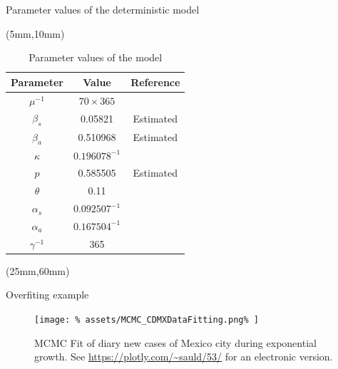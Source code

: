 \begin{bibunit}[plain]
	\begin{frame}{Parameter values of the deterministic model} %
	   \begin{textblock*}{120mm}(5mm,10mm)
		   \begin{table}
			\centering
			\begin{tabular}{ccc}
				\hline
				Parameter & Value & Reference\\ 
					\hline
				$\mu^{-1}$ & $70 \times 365$ & \cite{Acunya2021} 
				\\
				$\beta_s$ & 0.05821 & Estimated
				\\
				$\beta_a$ & 0.510968 & Estimated\\
				$\kappa$ & $0.196078^{-1}$ &  \cite{Tian2020}
				\\
				$p$ & 0.585505& Estimated\\          
				$\theta$ & 0.11 & \cite{Acunya2021}
				\\
				$\alpha_{s}$& $0.092507^{-1}$& \cite{Acunya2021}
				\\
				$\alpha_{a}$ & $0.167504^{-1}$& \cite{Acunya2021}
				\\ 
				$\gamma^{-1}$ & 365 & \cite{Acunya2021}
				\\
				\hline
			\end{tabular}
			\caption{Parameter values of the model}
			\label{table:parametermodel}
			\end{table}
		\end{textblock*}
		\begin{textblock*}{120mm}(25mm,60mm)
		\end{textblock*}
	\end{frame}
\end{bibunit}
\begin{frame}{Overfiting example}
	\begin{figure}[htb]
		\centering
		\texttt{[image: \%
			assets/MCMC\_CDMXDataFitting.png\%
		]}
		\caption{%
			MCMC Fit of diary new cases of Mexico city
			during exponential growth. See
			\url{https://plotly.com/~sauld/53/} for an electronic
			version.
		}
		\label{fig:data_CDMX_fitting}
	\end{figure}
\end{frame}


